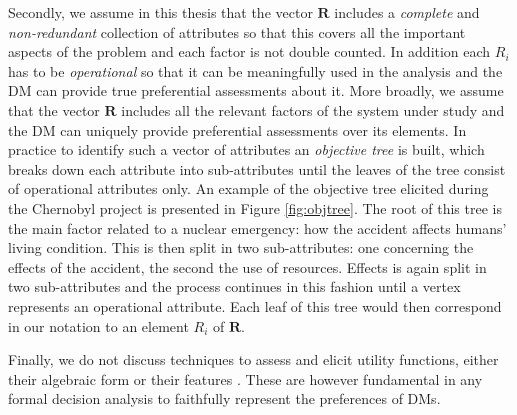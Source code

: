 Secondly, we  assume in this thesis that the vector $\bm{R}$ includes a \textit{complete} and \textit{non-redundant} collection of attributes so that this covers all the important aspects of the problem and each factor is not double counted. In addition each $R_i$ has to be \textit{operational} so that it can be meaningfully used in the analysis and the DM can provide true preferential assessments about it.  More broadly, we assume that the vector $\bm{R}$ includes all the relevant factors of the system under study and the DM can uniquely provide preferential assessments over its elements. In practice to identify such a vector of attributes an \textit{objective tree} \citep{Keeney1993a} is built, which breaks down each attribute into sub-attributes until the leaves of the tree consist of operational attributes only. An example of the objective tree elicited during the Chernobyl project is presented in Figure \ref{fig:objtree}. The root of this tree is the main factor related to a nuclear emergency: how the accident affects humans' living condition. This is then split in two sub-attributes: one concerning the effects of the accident, the second the use of resources. Effects is again split in two sub-attributes and the process continues in this fashion until a vertex represents an operational attribute. Each leaf of this tree would then correspond in our notation to an element $R_i$ of $\bm{R}$.

Finally, we do not discuss techniques to assess and elicit utility functions, either their algebraic form or their  features \citep[see e.g.][]{Clemen1996a,Keeney1993a,  Keeney2009,von1986}. These are however fundamental in any formal decision analysis to faithfully represent the preferences of DMs.

